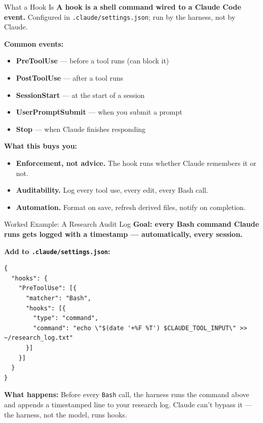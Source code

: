 \documentclass[aspectratio=169, 11pt]{beamer}
\begin{document}
\begin{frame}{What a Hook Is}
  \textbf{A hook is a shell command wired to a Claude Code event.} Configured in \texttt{.claude/settings.json}; run by the harness, not by Claude.

  \vspace{0.5em}
  \textbf{Common events:}
  \begin{itemize}\small
    \item \textbf{PreToolUse} --- before a tool runs (can block it)
    \item \textbf{PostToolUse} --- after a tool runs
    \item \textbf{SessionStart} --- at the start of a session
    \item \textbf{UserPromptSubmit} --- when you submit a prompt
    \item \textbf{Stop} --- when Claude finishes responding
  \end{itemize}

  \vspace{0.6em}
  \textbf{What this buys you:}
  \begin{itemize}\small
    \item \textbf{Enforcement, not advice.} The hook runs whether Claude remembers it or not.
    \item \textbf{Auditability.} Log every tool use, every edit, every Bash call.
    \item \textbf{Automation.} Format on save, refresh derived files, notify on completion.
  \end{itemize}
\end{frame}

\begin{frame}[fragile]{Worked Example: A Research Audit Log}
  \textbf{Goal: every Bash command Claude runs gets logged with a timestamp --- automatically, every session.}

  \vspace{0.4em}
  \textbf{Add to \texttt{.claude/settings.json}:}
  \begin{lstlisting}[basicstyle=\ttfamily\scriptsize]
{
  "hooks": {
    "PreToolUse": [{
      "matcher": "Bash",
      "hooks": [{
        "type": "command",
        "command": "echo \"$(date '+%F %T') $CLAUDE_TOOL_INPUT\" >> ~/research_log.txt"
      }]
    }]
  }
}
  \end{lstlisting}

  \vspace{0.3em}
  \textbf{What happens:} Before every \texttt{Bash} call, the harness runs the command above and appends a timestamped line to your research log. Claude can't bypass it --- the harness, not the model, runs hooks.
\end{frame}
\end{document}
